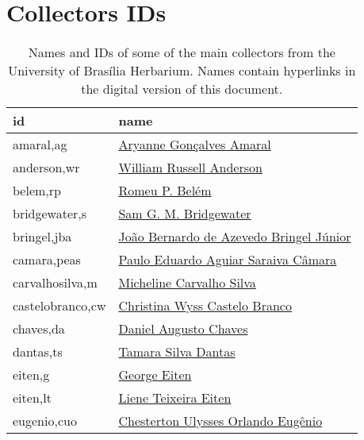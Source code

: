 \chapter{Collectors IDs}\label{appendix:collectors_ids}


\begin{longtable}{l l}
\caption[Names and IDs of some of the main collectors from the University of Brasília Herbarium]{Names and IDs of some of the main collectors from the University of Brasília Herbarium. Names contain hyperlinks in the digital version of this document.} \\
	  id & name \\
      \hline
amaral,ag           & \href{http://lattes.cnpq.br/0553088328180564}{Aryanne Gonçalves Amaral} \\
anderson,wr         & \href{https://plants.jstor.org/stable/10.5555/al.ap.person.bm000000177}{William Russell Anderson} \\             
belem,rp            & \href{https://plants.jstor.org/stable/10.5555/al.ap.person.bm000026951}{Romeu P. Belém} \\                       
bridgewater,s       & \href{https://plants.jstor.org/stable/10.5555/al.ap.person.bm000120171}{Sam G. M. Bridgewater} \\                
bringel,jba         & \href{http://lattes.cnpq.br/9359704960057451}{João Bernardo de Azevedo Bringel Júnior} \\
camara,peas         & \href{http://lattes.cnpq.br/2742831544064073}{Paulo Eduardo Aguiar Saraiva Câmara} \\
carvalhosilva,m     & \href{http://lattes.cnpq.br/1015868478480965}{Micheline Carvalho Silva} \\
castelobranco,cw    & \href{http://lattes.cnpq.br/6129052109183586}{Christina Wyss Castelo Branco} \\
chaves,da           & \href{http://lattes.cnpq.br/6993370381419092}{Daniel Augusto Chaves} \\
dantas,ts           & \href{http://lattes.cnpq.br/6233687711682398}{Tamara Silva Dantas} \\
eiten,g             & \href{https://plants.jstor.org/stable/10.5555/al.ap.person.bm000002352}{George Eiten} \\                         
eiten,lt            & \href{https://plants.jstor.org/stable/10.5555/al.ap.person.bm000002353}{Liene Teixeira Eiten} \\                 
eugenio,cuo         & \href{http://lattes.cnpq.br/3694741825113110}{Chesterton Ulysses Orlando Eugênio} \\

\end{longtable}
